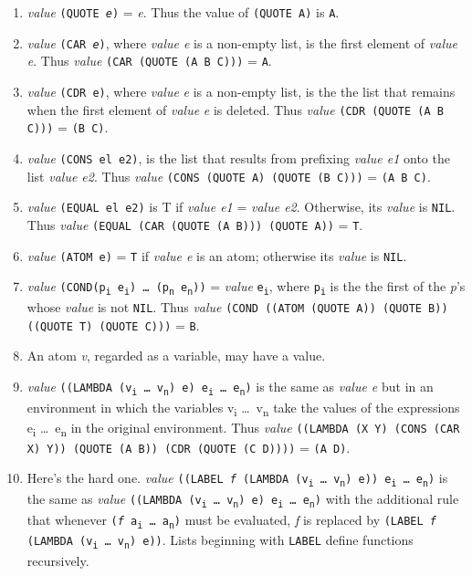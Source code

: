 \documentclass[8pt,letter,twocolumn]{article}
\newcommand{\args}[1] {#1\textsubscript{i} \dots \ #1\textsubscript{n}}
\newcommand{\ei}[0] {e\textsubscript{i}}
\newcommand{\en}[0] {e\textsubscript{n}}
\begin{document}
\begin{enumerate}
\setlength\itemsep{0em}
\item \textit{value} \texttt{(QUOTE \textit{e})} = \textit{e}. Thus the value of
  \texttt{(QUOTE A)} is \texttt{A}.

\item \textit{value} \texttt{(CAR \textit{e})}, where \textit{value e} is a
  non-empty list, is the first element of \textit{value e}. Thus \textit{value}
  \texttt{(CAR (QUOTE (A B C)))} = \texttt{A}.

\item \textit{value} \texttt{(CDR e)}, where \textit{value} \textit{e} is a
  non-empty list, is the the list that remains when the first element of
  \textit{value} \textit{e} is deleted. Thus \textit{value} \texttt{(CDR (QUOTE
    (A B C)))} = \texttt{(B C)}.

\item \textit{value} \texttt{(CONS el e2)}, is the list that results from
  prefixing \textit{value e1} onto the list \textit{value e2}. Thus
  \textit{value} \texttt{(CONS (QUOTE A) (QUOTE (B C)))} = \texttt{(A B C)}.

\item \textit{value} \texttt{(EQUAL el e2)} is T if \textit{value e1} =
  \textit{value e2}. Otherwise, its \textit{value} is \texttt{NIL}. Thus
  \textit{value} \texttt{(EQUAL (CAR (QUOTE (A B))) (QUOTE A))} = \texttt{T}.

\item \textit{value} \texttt{(ATOM e)} = \texttt{T} if \textit{value e} is an atom;
  otherwise its \textit{value} is \texttt{NIL}.

\item \textit{value} \texttt{(COND(p\textsubscript{i} \ei) \dots
    (p\textsubscript{n} \en))} = \textit{value}
  \texttt{\ei}, where \texttt{p\textsubscript{i}} is the the
  first of the \textit{p}\rq s whose \textit{value} is not \texttt{NIL}. Thus
  \textit{value} \texttt{(COND ((ATOM (QUOTE A)) (QUOTE B)) ((QUOTE T) (QUOTE
    C)))} = \texttt{B}.

\item An atom \textit{v}, regarded as a variable, may have a value.

\item \textit{value} \texttt{((LAMBDA (\args{v}) e) \args{e})} is the same as
  \textit{value e} but in an environment in which the variables \args{v} take
  the values of the expressions \args{e} in the original environment. Thus
  \textit{value} \texttt{((LAMBDA (X Y) (CONS (CAR X) Y)) (QUOTE (A B)) (CDR
    (QUOTE (C D))))} = \texttt{(A D)}.

\item Here\rq s the hard one. \textit{value} \texttt{((LABEL \textit{f} (LAMBDA
    (\args{v}) e)) \args{e})} is the same as \textit{value} \texttt{((LAMBDA
    (\args{v}) e) \args{e})} with the additional rule that whenever
  \texttt{(\textit{f} \args{a})} must be evaluated, \textit{f} is replaced by
  \texttt{(LABEL \textit{f} (LAMBDA (\args{v}) e))}. Lists beginning with \texttt{LABEL}
  define functions recursively.

\end{enumerate}
\end{document}
